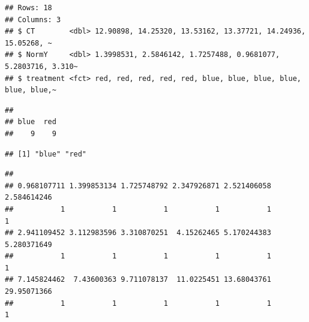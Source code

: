 \documentclass[
]{book}
\newenvironment{Shaded}{\begin{snugshade}}{\end{snugshade}}
\newcommand{\FunctionTok}[1]{\textcolor[rgb]{0.00,0.00,0.00}{#1}}
\newcommand{\NormalTok}[1]{#1}
\newcommand{\SpecialCharTok}[1]{\textcolor[rgb]{0.00,0.00,0.00}{#1}}
\begin{document}
\begin{verbatim}
## Rows: 18
## Columns: 3
## $ CT        <dbl> 12.90898, 14.25320, 13.53162, 13.37721, 14.24936, 15.05268, ~
## $ NormY     <dbl> 1.3998531, 2.5846142, 1.7257488, 0.9681077, 5.2803716, 3.310~
## $ treatment <fct> red, red, red, red, red, blue, blue, blue, blue, blue, blue,~
\end{verbatim}

\begin{Shaded}
\end{Shaded}

\begin{verbatim}
## 
## blue  red 
##    9    9
\end{verbatim}

\begin{Shaded}
\end{Shaded}

\begin{verbatim}
## [1] "blue" "red"
\end{verbatim}

\begin{Shaded}
\end{Shaded}

\begin{verbatim}
## 
## 0.968107711 1.399853134 1.725748792 2.347926871 2.521406058 2.584614246 
##           1           1           1           1           1           1 
## 2.941109452 3.112983596 3.310870251  4.15262465 5.170244383 5.280371649 
##           1           1           1           1           1           1 
## 7.145824462  7.43600363 9.711078137  11.0225451 13.68043761 29.95071366 
##           1           1           1           1           1           1
\end{verbatim}

\begin{Shaded}
\end{Shaded}
\end{document}
